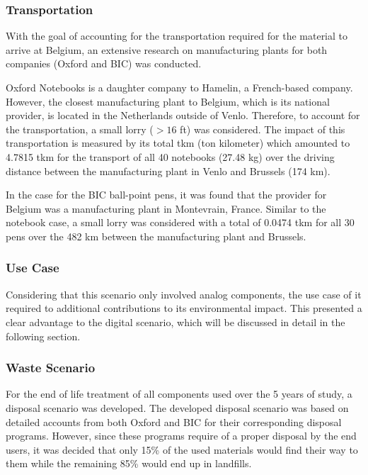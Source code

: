 \subsubsection*{Transportation}
With the goal of accounting for the transportation required for the material to arrive at Belgium, an extensive research on manufacturing plants for both companies (Oxford and BIC) was conducted.

Oxford Notebooks is a daughter company to Hamelin, a French-based company. However, the closest manufacturing plant to Belgium, which is its national provider, is located in the Netherlands outside of Venlo. Therefore, to account for the transportation, a small lorry ($> 16$ ft) was considered. The impact of this transportation is measured by its total tkm (ton kilometer) which amounted to 4.7815 tkm for the transport of all 40 notebooks (27.48 kg) over the driving distance between the manufacturing plant in Venlo and Brussels (174 km).

In the case for the BIC ball-point pens, it was found that the provider for Belgium was a manufacturing plant in Montevrain, France. Similar to the notebook case, a small lorry was considered with a total of 0.0474 tkm for all 30 pens over the 482 km between the manufacturing plant and Brussels.

\subsubsection*{Use Case}
Considering that this scenario only involved analog components, the use case of it required to additional contributions to its environmental impact. This presented a clear advantage to the digital scenario, which will be discussed in detail in the following section.

\subsubsection*{Waste Scenario}
For the end of life treatment of all components used over the 5 years of study, a disposal scenario was developed. The developed disposal scenario was based on detailed accounts from both Oxford and BIC for their corresponding disposal programs. However, since these programs require of a proper disposal by the end users, it was decided that only 15\% of the used materials would find their way to them while the remaining 85\% would end up in landfills.

